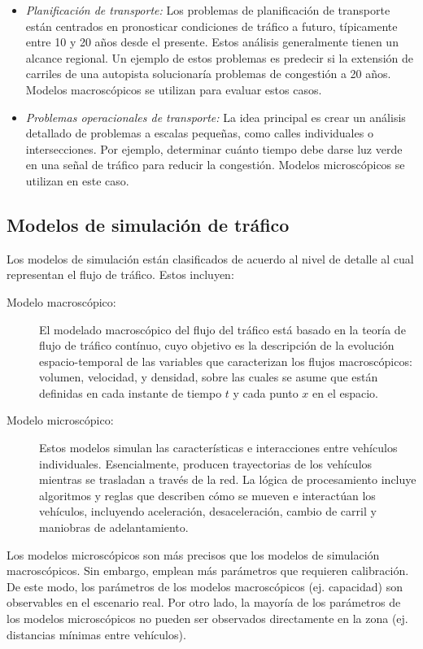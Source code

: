 \begin{itemize}
    \item \textit{Planificación de transporte:} Los problemas de planificación de transporte están centrados en pronosticar condiciones de tráfico a futuro, típicamente entre 10 y 20 años desde el presente. Estos análisis generalmente tienen un alcance regional. Un ejemplo de estos problemas es predecir si la extensión de carriles de una autopista solucionaría problemas de congestión a 20 años. Modelos macroscópicos se utilizan para evaluar estos casos.
    \item \textit{Problemas operacionales de transporte:} La idea principal es crear un análisis detallado de problemas a escalas pequeñas, como calles individuales o intersecciones. Por ejemplo, determinar cuánto tiempo debe darse luz verde en una señal de tráfico para reducir la congestión. Modelos microscópicos se utilizan en este caso.
\end{itemize}

\subsection{Modelos de simulación de tráfico}

Los modelos de simulación están clasificados de acuerdo al nivel de detalle al cual representan el flujo de tráfico. Estos incluyen:

\begin{description}
    \item [Modelo macroscópico:]
    El modelado macroscópico del flujo del tráfico está basado en la teoría de flujo de tráfico contínuo, cuyo objetivo es la descripción de la evolución espacio-temporal de las variables que caracterizan los flujos macroscópicos: volumen,  velocidad, y densidad, sobre las cuales se asume que están definidas en cada instante de tiempo $t$ y cada punto $x$ en el espacio\cite{barcelo2010fundamentals}. 
    \item [Modelo microscópico:] Estos modelos simulan las características e interacciones entre vehículos individuales. Esencialmente, producen trayectorias de los vehículos mientras se trasladan a través de la red. La lógica de procesamiento incluye algoritmos y reglas que describen cómo se mueven e interactúan los vehículos, incluyendo aceleración, desaceleración, cambio de carril y maniobras de adelantamiento.
\end{description}

Los modelos microscópicos son más precisos que los modelos de simulación macroscópicos. Sin embargo, emplean más parámetros que requieren calibración. De este modo, los parámetros de los modelos macroscópicos (ej. capacidad) son observables en el escenario real. Por otro lado, la mayoría de los parámetros de los modelos microscópicos no pueden ser observados directamente en la zona (ej. distancias mínimas entre vehículos)\cite{dowling2004traffic}.

